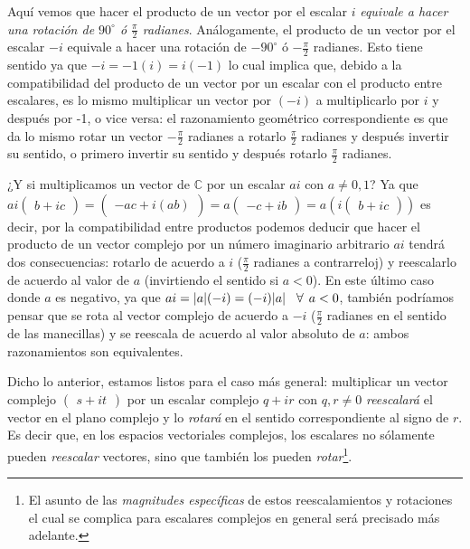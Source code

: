 \documentclass[12pt,dvipsnames]{article}
\begin{document}
   Aquí vemos que hacer el producto de un vector por el escalar $i$ \emph{equivale a hacer una rotación de $90^\circ$ ó $\frac{\pi}{2}$ radianes}. Análogamente, el producto de un vector por el escalar $-i$ equivale a hacer una rotación de $-90^\circ$ ó $-\frac{\pi}{2}$ radianes. Esto tiene sentido ya que $-i=-1(i)=i(-1)$ lo cual implica que, debido a la compatibilidad del producto de un vector por un escalar con el producto entre escalares, es lo mismo multiplicar un vector por $(-i)$ a multiplicarlo por $i$ y después por -1, o vice versa: el razonamiento geométrico correspondiente es que da lo mismo rotar un vector $-\frac{\pi}{2}$ radianes a rotarlo $\frac{\pi}{2}$ radianes y después invertir su sentido, o primero invertir su sentido y después rotarlo $\frac{\pi}{2}$ radianes. 

   ¿Y si multiplicamos un vector de $\mathbb{C}$ por un escalar $ai$ con $a\neq 0,1$? Ya que $ai\begin{pmatrix}b + ic\end{pmatrix}=\begin{pmatrix}-ac+i(ab)\end{pmatrix}=a\begin{pmatrix}-c+ib\end{pmatrix}=a(i\begin{pmatrix}b+ic\end{pmatrix})$ \textemdash es decir, por la compatibilidad entre productos\textemdash\hspace{0.5mm} podemos deducir que hacer el producto de un vector complejo por un número imaginario arbitrario $ai$ tendrá dos consecuencias: rotarlo de acuerdo a $i$ ($\frac{\pi}{2}$ radianes a contrarreloj) y reescalarlo de acuerdo al valor de $a$ (invirtiendo el sentido si $a<0$). En este último caso donde $a$ es negativo, ya que $ai=|a|(-i)=(-i)|a| \hspace{3mm}\forall\hspace{1.5mm} a<0$, también podríamos pensar que se rota al vector complejo de acuerdo a $-i$ ($\frac{\pi}{2}$ radianes en el sentido de las manecillas) y se reescala de acuerdo al valor absoluto de $a$: ambos razonamientos son equivalentes.

Dicho lo anterior, estamos listos para el caso más general: multiplicar un vector complejo $\begin{pmatrix}s+it\end{pmatrix}$ por un escalar complejo $q+ir$ con $q,r\neq0$ \emph{reescalará} el vector en el plano complejo y lo \emph{rotará} en el sentido correspondiente al signo de $r$. Es decir que, en los espacios vectoriales complejos, los escalares no sólamente pueden \emph{reescalar} vectores, sino que también los pueden \emph{rotar}\footnote{El asunto de las \emph{magnitudes específicas} de estos reescalamientos y rotaciones \textemdash el cual se complica para escalares complejos en general\textemdash\hspace{0.5mm} será precisado más adelante.}.
\end{document}
